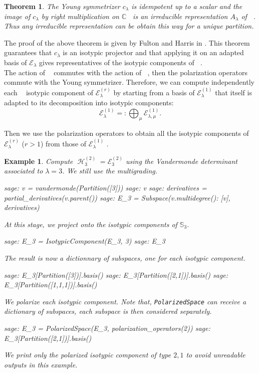 \documentclass[letter,12pt]{article}
\newcommand{\pauline}[1]{\todo[linecolor=blue,backgroundcolor=cyan!25,bordercolor=blue]{#1}}
\newcommand{\CC}{\mathbb{C}}
\newcommand{\Sym}[1]{\mathbb{S}_{#1}}
\DeclareMathOperator{\Sn}{\mathbb{S}_n}
\DeclareMathOperator{\GLr}{GL_r}
\DeclareMathOperator{\harmonics}{\mathcal{H}}
\newtheorem{theorem}{Theorem}
\newtheorem{example}{Example}
\begin{document}
	\begin{theorem}
		The Young symmetrizer $c_{\lambda}$ is idempotent up to a scalar and the image of $c_{\lambda}$ by right multiplication on $\CC \Sn$ is an irreducible representation $A_{\lambda}$ of $\Sn$.
		Thus any irreducible representation can be obtain this way for a unique partition. 
	\end{theorem}
	
	The proof of the above theorem is given by Fulton and Harris in \cite{FultonHarris1991}. 
	This theorem guarantees that $c_{\lambda}$ is an isotypic projector and that applying it on an adapted basis of $\mathcal{E}_{\lambda}$ gives representatives of the isotypic components of $\Sn$. \pauline{Need more details here.}  \\
	
	The action of $\GLr$ commutes with the action of $\Sn$, then the polarization operators commute with the Young symmetrizer. Therefore, we can compute independently each $\Sn$ isotypic component of $\mathcal{E}_\lambda^{(r)}$ by starting from a basis of $\mathcal{E}_\lambda^{(1)}$ that itself is adapted to its decomposition into isotypic components:
	$$\mathcal{E}_\lambda^{(1)}=:\bigoplus_\mu \mathcal{E}_{\lambda,\mu}^{(1)}.$$
	
	Then we use the polarization operators to obtain all the isotypic components of $\mathcal{E}_\lambda^{(r)}$ ($r>1$) from those of $\mathcal{E}_\lambda^{(1)}$ .
	
	\begin{example} \label{multigrading}
		Compute $\harmonics_3^{(2)} = \mathcal{E}_3^{(2)}$ using the Vandermonde determinant associated to $\lambda=3$. We still use the multigrading. 
		\begin{sagecommandline}
			sage: v = vandermonde(Partition([3]))
			sage: v
			sage: derivatives = partial_derivatives(v.parent())
			sage: E_3 = Subspace({v.multidegree(): [v]}, derivatives)
		\end{sagecommandline}
		At this stage, we project onto the isotypic components of $\Sym{3}$.
		\begin{sagecommandline}
			sage: E_3 = IsotypicComponent(E_3, 3)
			sage: E_3
		\end{sagecommandline}
		The result is now a dictionnary of subspaces, one for each isotypic component.
		\begin{sagecommandline}
			sage: E_3[Partition([3])].basis()
			sage: E_3[Partition([2,1])].basis()
			sage: E_3[Partition([1,1,1])].basis()
		\end{sagecommandline}
		We polarize each isotypic component. Note that, \texttt{PolarizedSpace} can receive a dictionary of subspaces, each subspace is then considered separately. 
		\begin{sagecommandline}
			sage: E_3 = PolarizedSpace(E_3, polarization_operators(2))
			sage: E_3[Partition([2,1])].basis()
		\end{sagecommandline}
	We print only the polarized isotypic component of type $2,1$ to avoid unreadable outputs in this example. 	
	\end{example}
		
\end{document}
